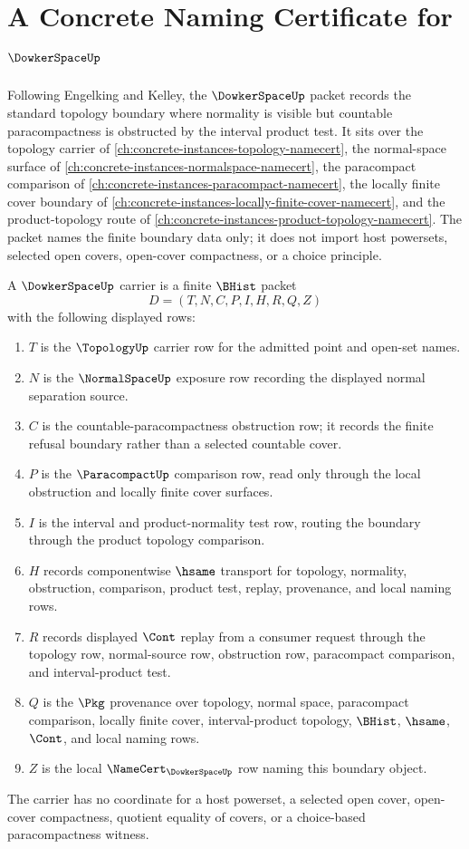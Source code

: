 \chapter{A Concrete Naming Certificate for $\DowkerSpaceUp$}
\label{ch:concrete-instances-dowker-space-namecert}

Following Engelking and Kelley, the $\DowkerSpaceUp$ packet records the standard topology boundary where normality is visible but countable paracompactness is obstructed by the interval product test. It sits over the topology carrier of \autoref{ch:concrete-instances-topology-namecert}, the normal-space surface of \autoref{ch:concrete-instances-normalspace-namecert}, the paracompact comparison of \autoref{ch:concrete-instances-paracompact-namecert}, the locally finite cover boundary of \autoref{ch:concrete-instances-locally-finite-cover-namecert}, and the product-topology route of \autoref{ch:concrete-instances-product-topology-namecert}. The packet names the finite boundary data only; it does not import host powersets, selected open covers, open-cover compactness, or a choice principle.

\begin{definition}
\label{def:dowker-space-carrier}
A $\DowkerSpaceUp$ carrier is a finite $\BHist$ packet
$$
D=(T,N,C,P,I,H,R,Q,Z)
$$
with the following displayed rows:
\begin{enumerate}
\item $T$ is the $\TopologyUp$ carrier row for the admitted point and open-set names.
\item $N$ is the $\NormalSpaceUp$ exposure row recording the displayed normal separation source.
\item $C$ is the countable-paracompactness obstruction row; it records the finite refusal boundary rather than a selected countable cover.
\item $P$ is the $\ParacompactUp$ comparison row, read only through the local obstruction and locally finite cover surfaces.
\item $I$ is the interval and product-normality test row, routing the boundary through the product topology comparison.
\item $H$ records componentwise $\hsame$ transport for topology, normality, obstruction, comparison, product test, replay, provenance, and local naming rows.
\item $R$ records displayed $\Cont$ replay from a consumer request through the topology row, normal-source row, obstruction row, paracompact comparison, and interval-product test.
\item $Q$ is the $\Pkg$ provenance over topology, normal space, paracompact comparison, locally finite cover, interval-product topology, $\BHist$, $\hsame$, $\Cont$, and local naming rows.
\item $Z$ is the local $\NameCert_{\DowkerSpaceUp}$ row naming this boundary object.
\end{enumerate}
The carrier has no coordinate for a host powerset, a selected open cover, open-cover compactness, quotient equality of covers, or a choice-based paracompactness witness.
\end{definition}

